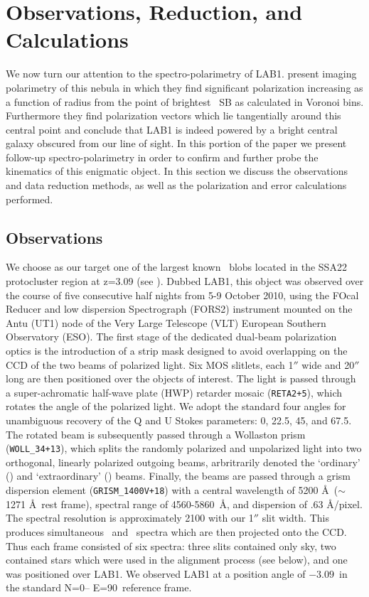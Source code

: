 \section{Observations, Reduction, and Calculations}\label{sec: data}
We now turn our attention to the spectro-polarimetry of LAB1.  \cite{HayesScarlata2011} present imaging polarimetry of this nebula in which they find significant polarization increasing as a function of radius from the point of brightest \lya~SB as calculated in Voronoi bins. Furthermore they find polarization vectors which lie tangentially around this central point and conclude that LAB1 is indeed powered by a bright central galaxy obscured from our line of sight. In this portion of the paper we present follow-up spectro-polarimetry in order to confirm and further probe the kinematics of this enigmatic object. In this section we discuss the observations and data reduction methods, as well as the polarization and error calculations performed.

\subsection{Observations}
We choose as our target one of the largest known \lya~blobs located in the SSA22 protocluster region at z=3.09 (see \cite{Steidel2000}).  Dubbed LAB1, this object was observed over the course of five consecutive half nights from 5-9 October 2010, using the FOcal Reducer and low dispersion Spectrograph (FORS2) \citep{Appenzeller1998} instrument mounted on the Antu (UT1) node of the Very Large Telescope (VLT) European Southern Observatory (ESO). The first stage of the dedicated dual-beam polarization optics is the introduction of a strip mask designed to avoid overlapping on the CCD of the two beams of polarized light.  Six MOS slitlets, each 1$''$ wide and 20$''$ long are then positioned over the objects of interest. The light is passed through a super-achromatic half-wave plate (HWP) retarder mosaic (\texttt{RETA2+5}), which rotates the angle of the polarized light. We adopt the standard four angles for unambiguous recovery of the Q and U Stokes parameters: 0\degs, 22.5\degs, 45\degs, and 67.5\degs. The rotated beam is subsequently passed through a Wollaston prism (\texttt{WOLL\_34+13}), which splits the randomly polarized and unpolarized light into two orthogonal, linearly polarized outgoing beams, arbritrarily denoted  the `ordinary' (\ord) and `extraordinary' (\ext) beams. Finally, the beams are passed through a grism dispersion element  (\texttt{GRISM\_1400V+18}) with a central wavelength of 5200 \AA~($\sim$1271 \AA~rest frame), spectral range of 4560-5860~\AA, and dispersion of .63 \AA/pixel. The spectral resolution is approximately 2100 with our 1$''$ slit width. This produces simultaneous \ord~and \ext~spectra which are then projected onto the CCD. Thus each frame consisted of six spectra: three slits contained only sky, two contained stars which were used in the alignment process (see below), and one was positioned over LAB1. We observed LAB1 at a position angle of $-3.09$\degs~in the standard N=0\degs -- E=90\degs~reference frame. 

